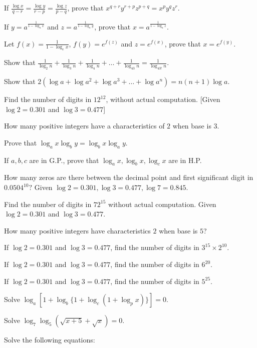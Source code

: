 \item If $\frac{\log x}{q - r} = \frac{\log y}{r - p} = \frac{\log z}{p - q}$, prove that $x^{q + r}y^{r + p}z^{p + q} =
  x^py^qz^r$.
\item If $y = a^{\frac{1}{1 - \log _ax}}$ and $z = a^{\frac{1}{1 - \log_ay}}$, prove that $x = a^{\frac{1}{1 - \log_az}}$.
\item Let $f(x) = \frac{1}{1 - \log_ex}$, $f(y) = e^{f(z)}$ and $z = e^{f(x)}$, prove that $x = e^{f(y)}$.
\item Show that $\frac{1}{\log_2n} + \frac{1}{\log_3n} + \frac{1}{\log_4n} + \ldots + \frac{1}{\log_{43}n} =
  \frac{1}{\log_{43!}n}$.
\item Show that $2(\log a + \log a^2 + \log a^3 + \ldots + \log a^n) = n(n + 1)\log a$.
\item Find the number of digits in $12^{12}$, without actual computation. [Given $\log 2 = 0.301$ and $\log 3 = 0.477$]
\item How many positive integers have a characteristics of $2$ when base is $3$.
\item Prove that $\log_ax\log_by = \log_bx\log_ay$.
\item If $a, b, c$ are in G.P., prove that $\log_ax, \log_bx, \log_cx$ are in H.P.
\item How many zeros are there between the decimal point and first significant digit in $0.0504^{10}?$ Given $\log 2 = 0.301, \log
  3 = 0.477, \log 7 = 0.845$.
\item Find the number of digits in $72^{15}$ without actual computation. Given $\log 2 = 0.301$ and $\log  3 = 0.477$.
\item How many positive integers have characteristics $2$ when base is $5$?
\item If $\log 2 = 0.301$ and $\log 3 =0.477$, find the number of digits in $3^{15}\times 2^{10}$.
\item If $\log 2 = 0.301$ and $\log 3 =0.477$, find the number of digits in $6^{20}$.
\item If $\log 2 = 0.301$ and $\log 3 =0.477$, find the number of digits in $5^{25}$.
\item Solve $\log_a[1 + \log_b\{1 + \log_c(1 + \log_px)\}] = 0$.
\item Solve $\log_7\log_5(\sqrt{x + 5} + \sqrt{x}) = 0$.
\stopitemize

\noindent Solve the following equations:

